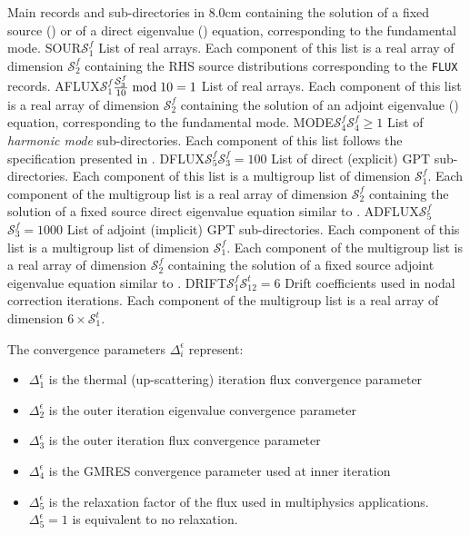 \begin{DescriptionEnregistrement}{Main records and sub-directories in }{8.0cm}
{  containing the solution of a fixed source () or of a direct eigenvalue () equation,
  corresponding to the fundamental mode.}
\DirlEnr
  {SOUR}{$\mathcal{S}^{f}_{1}$}
  {List of real arrays. Each component of this list is a real array of dimension $\mathcal{S}^{f}_{2}$
  containing the RHS source distributions corresponding to the {\tt FLUX} records.}
\OptDirlEnr
  {AFLUX}{$\mathcal{S}^{f}_{1}$}{${\mathcal{S}^{f}_{3}\over 10} \bmod 10 = 1$}
  {List of real arrays. Each component of this list is a real array of dimension $\mathcal{S}^{f}_{2}$
  containing the solution of an adjoint eigenvalue () equation,
  corresponding to the fundamental mode.}
\OptDirlEnr
  {MODE}{$\mathcal{S}^{f}_{4}$}{$\mathcal{S}^{f}_{4}\ge 1$}
  {List of {\sl harmonic mode} sub-directories. Each component of this list follows
  the specification presented in .}
\OptDirlEnr
  {DFLUX}{$\mathcal{S}^{f}_{5}$}{$\mathcal{S}^{f}_{3}=100$}
  {List of direct (explicit) GPT sub-directories. Each component of this list is a multigroup list of
  dimension $\mathcal{S}^{f}_{1}$. Each component of the multigroup list is a real array of dimension
  $\mathcal{S}^{f}_{2}$ containing the solution of a fixed source direct eigenvalue equation similar to .}
\OptDirlEnr
  {ADFLUX}{$\mathcal{S}^{f}_{5}$}{$\mathcal{S}^{f}_{3}=1000$}
  {List of adjoint (implicit) GPT sub-directories. Each component of this list is a multigroup list of
  dimension $\mathcal{S}^{f}_{1}$. Each component of the multigroup list is a real array of dimension
  $\mathcal{S}^{f}_{2}$ containing the solution of a fixed source adjoint eigenvalue equation similar to .}
\OptDirlEnr
  {DRIFT}{$\mathcal{S}^{f}_{1}$}{$\mathcal{S}^{t}_{12}=6$}
  {Drift coefficients used in nodal correction iterations. Each component of the multigroup list is a real array of dimension
  $6\times \mathcal{S}^{t}_{1}$.}
\end{DescriptionEnregistrement}

The convergence parameters $\Delta_i^\epsilon$ represent:
\begin{itemize}
\item $\Delta_1^\epsilon$ is the thermal (up-scattering) iteration flux convergence parameter
\item $\Delta_2^\epsilon$ is the outer iteration eigenvalue convergence parameter
\item $\Delta_3^\epsilon$ is the outer iteration flux convergence parameter
\item $\Delta_4^\epsilon$ is the GMRES convergence parameter used at inner iteration
\item $\Delta_5^\epsilon$ is the relaxation factor of the flux used in multiphysics applications. $\Delta_5^\epsilon=1$ is equivalent to no
relaxation.
\end{itemize}
\goodbreak

